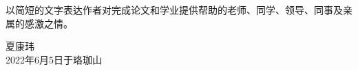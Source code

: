 
\acknowledgements


以简短的文字表达作者对完成论文和学业提供帮助的老师、同学、领导、同事及亲属的感激之情。


\begin{signature}
  夏康玮 \\
  2022年6月5日于珞珈山
\end{signature}